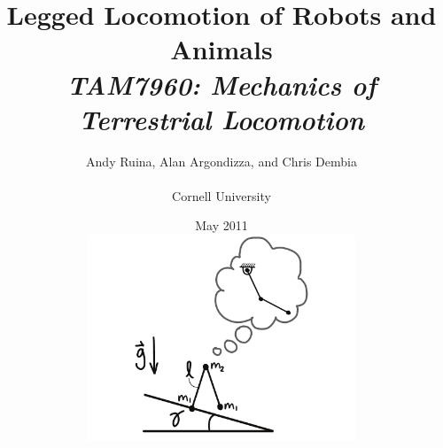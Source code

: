 \documentclass[normalsize]{book}
\begin{document}




\title{Legged Locomotion of Robots and Animals\\\textit{\large{TAM7960: Mechanics of Terrestrial Locomotion}}}
\author{Andy Ruina, Alan Argondizza, and Chris Dembia\\\\Cornell University}
\date{May 2011 \\ 
\vspace{1in} 
\includegraphics[width=0.6\textwidth]{Figures/SimplestWalkerPendulum} }


\maketitle



\tableofcontents
\listoffigures











\end{document}
